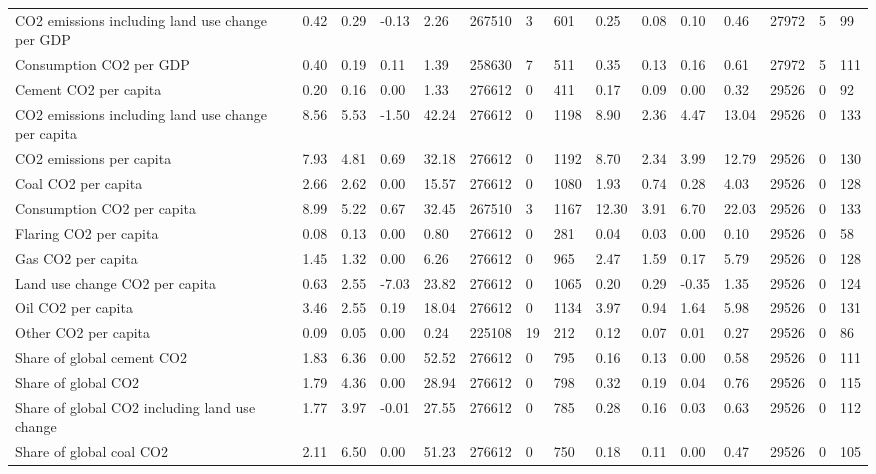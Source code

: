 \begin{longtable}{lllllllllllllll}
CO2 emissions including land use change per GDP & 0.42 & 0.29 & -0.13 & 2.26 & 267510 & 3 & 601 & 0.25 & 0.08 & 0.10 & 0.46 & 27972 & 5 & 99\\
\addlinespace
Consumption CO2 per GDP & 0.40 & 0.19 & 0.11 & 1.39 & 258630 & 7 & 511 & 0.35 & 0.13 & 0.16 & 0.61 & 27972 & 5 & 111\\
Cement CO2 per capita & 0.20 & 0.16 & 0.00 & 1.33 & 276612 & 0 & 411 & 0.17 & 0.09 & 0.00 & 0.32 & 29526 & 0 & 92\\
CO2 emissions including land use change per capita & 8.56 & 5.53 & -1.50 & 42.24 & 276612 & 0 & 1198 & 8.90 & 2.36 & 4.47 & 13.04 & 29526 & 0 & 133\\
CO2 emissions per capita & 7.93 & 4.81 & 0.69 & 32.18 & 276612 & 0 & 1192 & 8.70 & 2.34 & 3.99 & 12.79 & 29526 & 0 & 130\\
Coal CO2 per capita & 2.66 & 2.62 & 0.00 & 15.57 & 276612 & 0 & 1080 & 1.93 & 0.74 & 0.28 & 4.03 & 29526 & 0 & 128\\
\addlinespace
Consumption CO2 per capita & 8.99 & 5.22 & 0.67 & 32.45 & 267510 & 3 & 1167 & 12.30 & 3.91 & 6.70 & 22.03 & 29526 & 0 & 133\\
Flaring CO2 per capita & 0.08 & 0.13 & 0.00 & 0.80 & 276612 & 0 & 281 & 0.04 & 0.03 & 0.00 & 0.10 & 29526 & 0 & 58\\
Gas CO2 per capita & 1.45 & 1.32 & 0.00 & 6.26 & 276612 & 0 & 965 & 2.47 & 1.59 & 0.17 & 5.79 & 29526 & 0 & 128\\
Land use change CO2 per capita & 0.63 & 2.55 & -7.03 & 23.82 & 276612 & 0 & 1065 & 0.20 & 0.29 & -0.35 & 1.35 & 29526 & 0 & 124\\
Oil CO2 per capita & 3.46 & 2.55 & 0.19 & 18.04 & 276612 & 0 & 1134 & 3.97 & 0.94 & 1.64 & 5.98 & 29526 & 0 & 131\\
\addlinespace
Other CO2 per capita & 0.09 & 0.05 & 0.00 & 0.24 & 225108 & 19 & 212 & 0.12 & 0.07 & 0.01 & 0.27 & 29526 & 0 & 86\\
Share of global cement CO2 & 1.83 & 6.36 & 0.00 & 52.52 & 276612 & 0 & 795 & 0.16 & 0.13 & 0.00 & 0.58 & 29526 & 0 & 111\\
Share of global CO2 & 1.79 & 4.36 & 0.00 & 28.94 & 276612 & 0 & 798 & 0.32 & 0.19 & 0.04 & 0.76 & 29526 & 0 & 115\\
Share of global CO2 including land use change & 1.77 & 3.97 & -0.01 & 27.55 & 276612 & 0 & 785 & 0.28 & 0.16 & 0.03 & 0.63 & 29526 & 0 & 112\\
Share of global coal CO2 & 2.11 & 6.50 & 0.00 & 51.23 & 276612 & 0 & 750 & 0.18 & 0.11 & 0.00 & 0.47 & 29526 & 0 & 105\\

\end{longtable}
